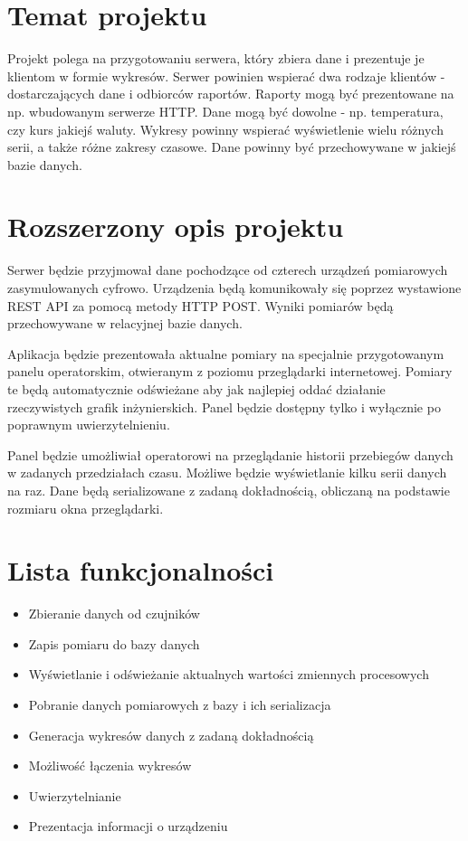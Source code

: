 \documentclass{article}
\begin{document}
\section{Temat projektu}
Projekt polega na przygotowaniu serwera, który zbiera dane i prezentuje 
je klientom w formie wykresów.
Serwer powinien wspierać dwa rodzaje klientów - dostarczających dane 
i odbiorców raportów.
Raporty mogą być prezentowane na np. wbudowanym serwerze HTTP.
Dane mogą być dowolne - np. temperatura, czy kurs jakiejś waluty. 
Wykresy powinny wspierać wyświetlenie wielu różnych serii, 
a także różne zakresy czasowe.
Dane powinny być przechowywane w jakiejś bazie danych.

\section{Rozszerzony opis projektu}
Serwer będzie przyjmował dane pochodzące od czterech urządzeń pomiarowych
zasymulowanych cyfrowo. Urządzenia będą komunikowały się poprzez wystawione REST API
za pomocą metody HTTP POST. Wyniki pomiarów będą przechowywane w relacyjnej bazie danych.

Aplikacja będzie prezentowała aktualne pomiary na specjalnie przygotowanym panelu 
operatorskim, otwieranym z poziomu przeglądarki internetowej. Pomiary te będą automatycznie 
odświeżane aby jak najlepiej oddać działanie rzeczywistych grafik inżynierskich. Panel 
będzie dostępny tylko i wyłącznie po poprawnym uwierzytelnieniu.

Panel będzie umożliwiał operatorowi na przeglądanie historii przebiegów danych w 
zadanych przedziałach czasu. Możliwe będzie wyświetlanie kilku serii danych na raz.
Dane będą serializowane z zadaną dokładnością, obliczaną na podstawie rozmiaru okna
przeglądarki.

\section{Lista funkcjonalności}

\begin{itemize}
	\item Zbieranie danych od czujników
	\item Zapis pomiaru do bazy danych
	\item Wyświetlanie i odświeżanie aktualnych wartości zmiennych procesowych
	\item Pobranie danych pomiarowych z bazy i ich serializacja
	\item Generacja wykresów danych z zadaną dokładnością
	\item Możliwość łączenia wykresów
	\item Uwierzytelnianie
	\item Prezentacja informacji o urządzeniu
\end{itemize}
\end{document}
